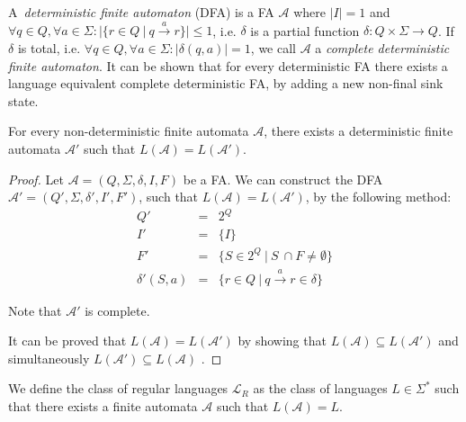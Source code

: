 A~\emph{deterministic finite automaton} (DFA) is a FA $\mathcal{A}$ where $|I| =
1$ and $\forall q \in Q, \forall a \in \Sigma: |\{ r \in Q\ |\ q
\overset{a}{\longrightarrow} r\}| \leq 1$, i.e. $\delta$ is a partial function
$\delta : Q \times \Sigma \longrightarrow Q$. If $\delta$ is total, i.e.
$\forall q \in Q, \forall a \in \Sigma : |\delta(q, a)| = 1$, we call
$\mathcal{A}$ a \emph{complete deterministic finite automaton}. It can be shown
that for every deterministic FA there exists a language equivalent complete
deterministic FA, by adding a new non-final sink state.
	
	\begin{lemma}
For every non-deterministic finite automata $\mathcal{A}$, there exists a
deterministic finite automata $\mathcal{A}'$ such that $L(\mathcal{A}) =
L(\mathcal{A}')$.
	\end{lemma}
	
	\begin{proof}
	Let $\mathcal{A} = (Q, \Sigma, \delta, I, F)$ be a FA. We can construct
	the DFA $\mathcal{A}'= (Q', \Sigma, \delta', I', F')$, such that
	$L(\mathcal{A}) = L(\mathcal{A}')$, by the following method:
	\begin{eqnarray*}
	 Q' & = & 2^Q\\
	 I' & = & \{I\}\\
	 F' & = & \{S \in 2^Q\ |\ S~\cap F \neq \emptyset\}\\
	 \delta'(S, a) & = & \{r \in Q\ |\ q \overset{a}{\longrightarrow} r \in
	 \delta\}
	\end{eqnarray*}
	
	Note that $\mathcal{A}'$ is complete.
	
	It can be proved that $L(\mathcal{A}) = L(\mathcal{A}')$ by showing that
	$L(\mathcal{A}) \subseteq L(\mathcal{A}')$ and simultaneously $L(\mathcal{A}')
	\subseteq L(\mathcal{A})$ \cite{tin}.
	\end{proof}
	
	\begin{defz}
We define the class of regular languages $\mathcal{L}_R$ as the class of
languages $L \in \Sigma^*$ such that there exists a finite automata
$\mathcal{A}$ such that $L(\mathcal{A}) = L$.
	\end{defz}
	
